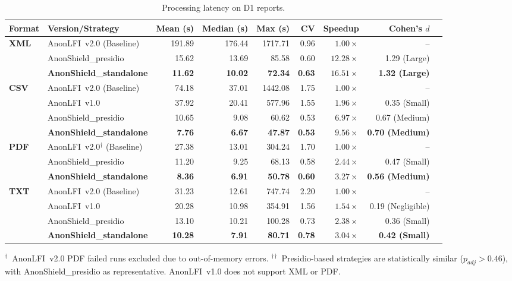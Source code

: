 \documentclass[12pt]{article}
\begin{document}
\begin{table}[!htp]
\centering
\caption{Processing latency on D1 reports.}
\label{tab:d1_scientific_performance}
\scriptsize
\begin{tabular}{llrrrrrrc}
\toprule
\textbf{Format} & \textbf{Version/Strategy} & \textbf{Mean (s)} & \textbf{Median (s)} & \textbf{Max (s)} & \textbf{CV} & \textbf{Speedup} & \textbf{Cohen's $d$} \\
\midrule
\multirow{3}{*}{\textbf{XML}} & AnonLFI~v2.0 (Baseline) & 191.89 & 176.44 & 1717.71 & 0.96 & $1.00\times$ & -- \\
 & AnonShield\_presidio & 15.62 & 13.69 & 85.58 & 0.60 & $12.28\times$ & 1.29 (Large) \\
 & \textbf{AnonShield\_standalone} & \textbf{11.62} & \textbf{10.02} & \textbf{72.34} & \textbf{0.63} & $\mathbf{16.51\times}$ & \textbf{1.32 (Large)} \\
\midrule
\multirow{4}{*}{\textbf{CSV}} & AnonLFI~v2.0 (Baseline) & 74.18 & 37.01 & 1442.08 & 1.75 & $1.00\times$ & -- \\
 & AnonLFI~v1.0 & 37.92 & 20.41 & 577.96 & 1.55 & $1.96\times$ & 0.35 (Small) \\
 & AnonShield\_presidio & 10.65 & 9.08 & 60.62 & 0.53 & $6.97\times$ & 0.67 (Medium) \\
 & \textbf{AnonShield\_standalone} & \textbf{7.76} & \textbf{6.67} & \textbf{47.87} & \textbf{0.53} & $\mathbf{9.56\times}$ & \textbf{0.70 (Medium)} \\
\midrule
\multirow{3}{*}{\textbf{PDF}} & AnonLFI~v2.0$^{\dag}$ (Baseline) & 27.38 & 13.01 & 304.24 & 1.70 & $1.00\times$ & -- \\
 & AnonShield\_presidio & 11.20 & 9.25 & 68.13 & 0.58 & $2.44\times$ & 0.47 (Small) \\
 & \textbf{AnonShield\_standalone} & \textbf{8.36} & \textbf{6.91} & \textbf{50.78} & \textbf{0.60} & $\mathbf{3.27\times}$ & \textbf{0.56 (Medium)} \\
\midrule
\multirow{4}{*}{\textbf{TXT}} & AnonLFI~v2.0 (Baseline) & 31.23 & 12.61 & 747.74 & 2.20 & $1.00\times$ & -- \\
 & AnonLFI~v1.0 & 20.28 & 10.98 & 354.91 & 1.56 & $1.54\times$ & 0.19 (Negligible) \\
 & AnonShield\_presidio & 13.10 & 10.21 & 100.28 & 0.73 & $2.38\times$ & 0.36 (Small) \\
 & \textbf{AnonShield\_standalone} & \textbf{10.28} & \textbf{7.91} & \textbf{80.71} & \textbf{0.78} & $\mathbf{3.04\times}$ & \textbf{0.42 (Small)} \\
\bottomrule
\end{tabular}
{\scriptsize $^{\dag}$~AnonLFI~v2.0 PDF failed runs excluded due to out-of-memory errors. $^{\dag}$$^{\dag}$~Presidio-based strategies are statistically similar ($p_{adj} > 0.46$), with AnonShield\_presidio as representative. AnonLFI~v1.0 does not support XML or PDF.}
\end{table}
\end{document}
